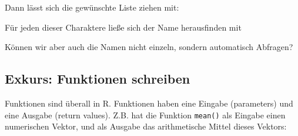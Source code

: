 \documentclass[
  ngerman,
]{article}
\newenvironment{Shaded}{\begin{snugshade}}{\end{snugshade}}
\newcommand{\CommentTok}[1]{\textcolor[rgb]{0.56,0.35,0.01}{\textit{#1}}}
\newcommand{\DocumentationTok}[1]{\textcolor[rgb]{0.56,0.35,0.01}{\textbf{\textit{#1}}}}
\newcommand{\FunctionTok}[1]{\textcolor[rgb]{0.00,0.00,0.00}{#1}}
\newcommand{\NormalTok}[1]{#1}
\newcommand{\OtherTok}[1]{\textcolor[rgb]{0.56,0.35,0.01}{#1}}
\newcommand{\SpecialCharTok}[1]{\textcolor[rgb]{0.00,0.00,0.00}{#1}}
\newcommand{\StringTok}[1]{\textcolor[rgb]{0.31,0.60,0.02}{#1}}
\begin{document}
Dann lässt sich die gewünschte Liste ziehen mit:

\begin{Shaded}
\end{Shaded}

Für jeden dieser Charaktere ließe sich der Name herausfinden mit

\begin{Shaded}
\end{Shaded}

Können wir aber auch die Namen nicht einzeln, sondern automatisch Abfragen?

\hypertarget{exkurs-funktionen-schreiben}{%
\subsection{Exkurs: Funktionen schreiben}\label{exkurs-funktionen-schreiben}}

Funktionen sind überall in R. Funktionen haben eine Eingabe (parameters) und eine Ausgabe (return values). Z.B. hat die Funktion \texttt{mean()} als Eingabe einen numerischen Vektor, und als Ausgabe das arithmetische Mittel dieses Vektors:

\begin{Shaded}
\end{Shaded}
\end{document}
